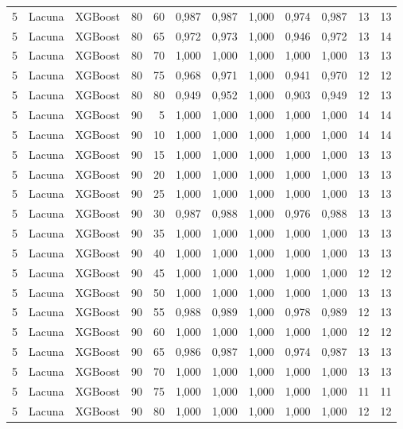 \begin{longtable}{@{}rllrrrrrrrrr@{}}
5 & Lacuna & XGBoost & 80 & 60 & 0,987 & 0,987 & 1,000 & 0,974 & 0,987 & 13 & 13 \\
5 & Lacuna & XGBoost & 80 & 65 & 0,972 & 0,973 & 1,000 & 0,946 & 0,972 & 13 & 14 \\
5 & Lacuna & XGBoost & 80 & 70 & 1,000 & 1,000 & 1,000 & 1,000 & 1,000 & 13 & 13 \\
5 & Lacuna & XGBoost & 80 & 75 & 0,968 & 0,971 & 1,000 & 0,941 & 0,970 & 12 & 12 \\
5 & Lacuna & XGBoost & 80 & 80 & 0,949 & 0,952 & 1,000 & 0,903 & 0,949 & 12 & 13 \\
5 & Lacuna & XGBoost & 90 & 5 & 1,000 & 1,000 & 1,000 & 1,000 & 1,000 & 14 & 14 \\
5 & Lacuna & XGBoost & 90 & 10 & 1,000 & 1,000 & 1,000 & 1,000 & 1,000 & 14 & 14 \\
5 & Lacuna & XGBoost & 90 & 15 & 1,000 & 1,000 & 1,000 & 1,000 & 1,000 & 13 & 13 \\
5 & Lacuna & XGBoost & 90 & 20 & 1,000 & 1,000 & 1,000 & 1,000 & 1,000 & 13 & 13 \\
5 & Lacuna & XGBoost & 90 & 25 & 1,000 & 1,000 & 1,000 & 1,000 & 1,000 & 13 & 13 \\
5 & Lacuna & XGBoost & 90 & 30 & 0,987 & 0,988 & 1,000 & 0,976 & 0,988 & 13 & 13 \\
5 & Lacuna & XGBoost & 90 & 35 & 1,000 & 1,000 & 1,000 & 1,000 & 1,000 & 13 & 13 \\
5 & Lacuna & XGBoost & 90 & 40 & 1,000 & 1,000 & 1,000 & 1,000 & 1,000 & 13 & 13 \\
5 & Lacuna & XGBoost & 90 & 45 & 1,000 & 1,000 & 1,000 & 1,000 & 1,000 & 12 & 12 \\
5 & Lacuna & XGBoost & 90 & 50 & 1,000 & 1,000 & 1,000 & 1,000 & 1,000 & 13 & 13 \\
5 & Lacuna & XGBoost & 90 & 55 & 0,988 & 0,989 & 1,000 & 0,978 & 0,989 & 12 & 13 \\
5 & Lacuna & XGBoost & 90 & 60 & 1,000 & 1,000 & 1,000 & 1,000 & 1,000 & 12 & 12 \\
5 & Lacuna & XGBoost & 90 & 65 & 0,986 & 0,987 & 1,000 & 0,974 & 0,987 & 13 & 13 \\
5 & Lacuna & XGBoost & 90 & 70 & 1,000 & 1,000 & 1,000 & 1,000 & 1,000 & 13 & 13 \\
5 & Lacuna & XGBoost & 90 & 75 & 1,000 & 1,000 & 1,000 & 1,000 & 1,000 & 11 & 11 \\
5 & Lacuna & XGBoost & 90 & 80 & 1,000 & 1,000 & 1,000 & 1,000 & 1,000 & 12 & 12 \\

\end{longtable}
